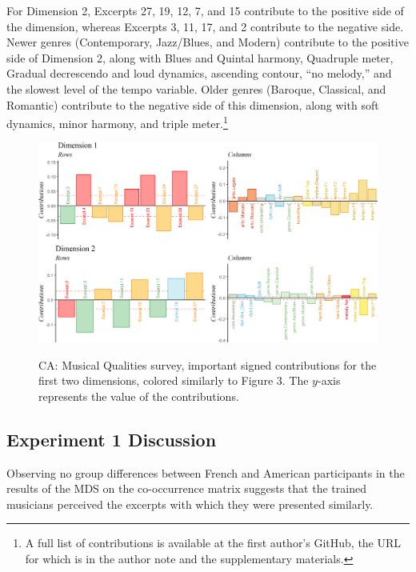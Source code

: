 \documentclass[
  english,
  man]{apa6}
\begin{document}
For Dimension 2, Excerpts 27, 19, 12, 7, and 15 contribute to the positive side of the dimension, whereas Excerpts 3, 11, 17, and 2 contribute to the negative side. Newer genres (Contemporary, Jazz/Blues, and Modern) contribute to the positive side of Dimension 2, along with Blues and Quintal harmony, Quadruple meter, Gradual decrescendo and loud dynamics, ascending contour, ``no melody,'' and the slowest level of the tempo variable. Older genres (Baroque, Classical, and Romantic) contribute to the negative side of this dimension, along with soft dynamics, minor harmony, and triple meter.\footnote{A full list of contributions is available at the first author's GitHub, the URL for which is in the author note and the supplementary materials.}

\begin{figure}   
  \centering  
  \caption{CA: Musical Qualities survey, important signed contributions for the first two dimensions, colored similarly to Figure 3. The $y$-axis represents the value of the contributions.}
    \includegraphics{./Music-Descriptor-Space_files/figure-latex/contributionsQcode-1.png}
  \label{fig:contributionsQ}
\end{figure}

\hypertarget{experiment-1-discussion}{%
\subsection{Experiment 1 Discussion}\label{experiment-1-discussion}}

Observing no group differences between French and American participants in the results of the MDS on the co-occurrence matrix suggests that the trained musicians perceived the excerpts with which they were presented similarly.
\end{document}
